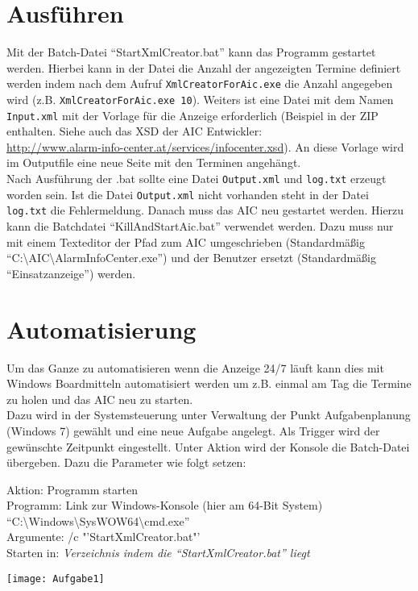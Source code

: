\documentclass[a4paper,onecolumn,notitlepage,11pt,liststotoc,bibtotoc]{scrartcl}
\begin{document}
\section{Ausführen}
Mit der Batch-Datei "`StartXmlCreator.bat"' kann das Programm gestartet werden. Hierbei kann in der Datei die Anzahl der angezeigten Termine definiert werden indem nach dem Aufruf \texttt{XmlCreatorForAic.exe} die Anzahl angegeben wird (z.B. \texttt{XmlCreatorForAic.exe 10}). Weiters ist eine Datei mit dem Namen \texttt{Input.xml} mit der Vorlage für die Anzeige erforderlich (Beispiel in der ZIP enthalten. Siehe auch das XSD der AIC Entwickler:\\ \url{http://www.alarm-info-center.at/services/infocenter.xsd}). An diese Vorlage wird im Outputfile eine neue Seite mit den Terminen angehängt.\\
Nach Ausführung der .bat sollte eine Datei \texttt{Output.xml} und \texttt{log.txt} erzeugt worden sein. Ist die Datei \texttt{Output.xml} nicht vorhanden steht in der Datei \texttt{log.txt} die Fehlermeldung.
Danach muss das AIC neu gestartet werden. Hierzu kann die Batchdatei "`KillAndStartAic.bat"' verwendet werden. Dazu muss nur mit einem Texteditor der Pfad zum AIC umgeschrieben (Standardmäßig "`C:\textbackslash AIC\textbackslash AlarmInfoCenter.exe"') und der Benutzer ersetzt (Standardmäßig "`Einsatzanzeige"') werden.
%
\section{Automatisierung}
Um das Ganze zu automatisieren wenn die Anzeige 24/7 läuft kann dies mit Windows Boardmitteln automatisiert werden um z.B. einmal am Tag die Termine zu holen und das AIC neu zu starten.\\
Dazu wird in der Systemsteuerung unter Verwaltung der Punkt Aufgabenplanung (Windows 7) gewählt und eine neue Aufgabe angelegt. Als Trigger wird der gewünschte Zeitpunkt eingestellt. Unter Aktion wird der Konsole die Batch-Datei übergeben. Dazu die Parameter wie folgt setzen:

Aktion: Programm starten\\
Programm: Link zur Windows-Konsole (hier am 64-Bit System) "`C:\textbackslash Windows\textbackslash SysWOW64\textbackslash cmd.exe"'\\
Argumente: /c "'StartXmlCreator.bat"'\\
Starten in: \emph{Verzeichnis indem die "`StartXmlCreator.bat"' liegt}
\begin{center}
  \texttt{[image: Aufgabe1]}
\end{center}
\end{document}
